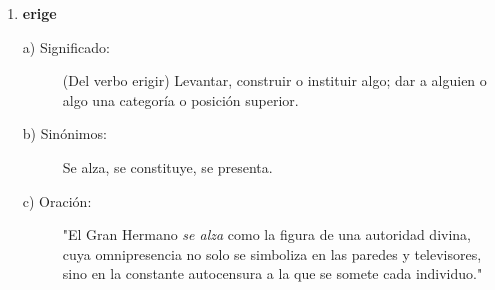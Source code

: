 \documentclass[11pt, a4paper]{article}
\begin{document}
\begin{enumerate}
    \item \textbf{erige}
    \begin{description}
        \item[a) Significado:] (Del verbo erigir) Levantar, construir o instituir algo; dar a alguien o algo una categoría o posición superior.
        \item[b) Sinónimos:] Se alza, se constituye, se presenta.
        \item[c) Oración:] "El Gran Hermano \textit{se alza} como la figura de una autoridad divina, cuya omnipresencia no solo se simboliza en las paredes y televisores, sino en la constante autocensura a la que se somete cada individuo."
    \end{description}

\end{enumerate} %

\end{document}
